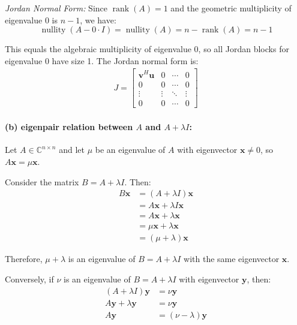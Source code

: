\emph{Jordan Normal Form:} Since $\operatorname{rank}(A) = 1$ and the geometric multiplicity of eigenvalue 0 is $n-1$, we have:
\[
    \operatorname{nullity}\left(A- 0 \cdot I\right) = \operatorname{nullity}(A) = n - \operatorname{rank}(A) = n - 1
\]

This equals the algebraic multiplicity of eigenvalue 0, so all Jordan blocks for eigenvalue 0 have size 1.
The Jordan normal form is:
\begin{align*}
    J = \begin{bmatrix}
            \mathbf{v}^H \mathbf{u} & 0      & \cdots & 0      \\
            0                       & 0      & \cdots & 0      \\
            \vdots                  & \vdots & \ddots & \vdots \\
            0                       & 0      & \cdots & 0
        \end{bmatrix}
\end{align*}

\paragraph{(b) eigenpair relation between $A$ and $A + \lambda I$:}
Let $A \in \mathbb{C}^{n \times n}$ and let $\mu$ be an eigenvalue of $A$ with eigenvector $\mathbf{x} \neq 0$, so $A\mathbf{x} = \mu\mathbf{x}$.

Consider the matrix $B = A + \lambda I$. Then:
\begin{align*}
    B\mathbf{x} & = \left(A+ \lambda I\right)\mathbf{x} \\
                & = A\mathbf{x} + \lambda I\mathbf{x}   \\
                & = A\mathbf{x} + \lambda \mathbf{x}    \\
                & = \mu\mathbf{x} + \lambda \mathbf{x}  \\
                & = (\mu + \lambda)\mathbf{x}
\end{align*}

Therefore, $\mu + \lambda$ is an eigenvalue of $B = A + \lambda I$ with the same eigenvector $\mathbf{x}$.

Conversely, if $\nu$ is an eigenvalue of $B = A + \lambda I$ with eigenvector $\mathbf{y}$, then:
\begin{align*}
    \left(A+ \lambda I\right)\mathbf{y} & = \nu \mathbf{y}            \\
    A\mathbf{y} + \lambda \mathbf{y}    & = \nu \mathbf{y}            \\
    A\mathbf{y}                         & = (\nu - \lambda)\mathbf{y}
\end{align*}

